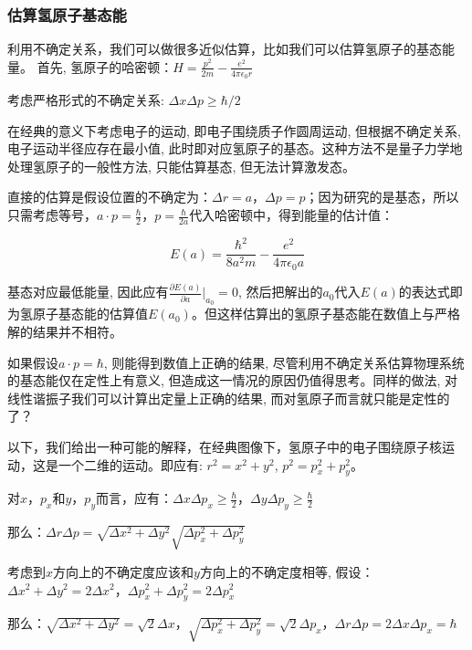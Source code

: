 \subsubsection{估算氢原子基态能}

利用不确定关系，我们可以做很多近似估算，比如我们可以估算氢原子的基态能量。
首先, 氢原子的哈密顿：$H = \frac{p^2}{2m} - \frac{e^2}{4 \pi
\epsilon_0 r}$



考虑严格形式的不确定关系: $\Delta x \Delta p \ge \hbar /2$

在经典的意义下考虑电子的运动, 即电子围绕质子作圆周运动,
但根据不确定关系, 电子运动半径应存在最小值,
此时即对应氢原子的基态。这种方法不是量子力学地处理氢原子的一般性方法,
只能估算基态, 但无法计算激发态。

直接的估算是假设位置的不确定为：$\Delta r = a$，$\Delta p =
p$；因为研究的是基态，所以只需考虑等号，$a \cdot p =
\frac{\hbar}{2}$，$p=\frac{\hbar}{2a}$代入哈密顿中，得到能量的估计值：

\begin{equation*}
  E(a)=\frac{\hbar^2}{8 a^2 m} - \frac{e^2}{4 \pi \epsilon_0 a}
\end{equation*}

基态对应最低能量, 因此应有$\frac{\partial E(a)}{\partial a} |_{a_0}
= 0$,
然后把解出的$a_0$代入$E(a)$的表达式即为氢原子基态能的估算值$E(a_0)$。但这样估算出的氢原子基态能在数值上与严格解的结果并不相符。


如果假设$a \cdot p = \hbar$, 则能得到数值上正确的结果,
尽管利用不确定关系估算物理系统的基态能仅在定性上有意义,
但造成这一情况的原因仍值得思考。同样的做法,
对线性谐振子我们可以计算出定量上正确的结果,
而对氢原子而言就只能是定性的了？

以下，我们给出一种可能的解释，在经典图像下，氢原子中的电子围绕原子核运动，这是一个二维的运动。即应有:
$r^2 =x^2 + y^2$, $p^2 = p_x^2 + p_y^2$。

对$x$，$p_x$和$y$，$p_y$而言，应有：$\Delta x \Delta p_x \ge
\frac{\hbar}{2}$，$\Delta y \Delta p_y \ge \frac{\hbar}{2}$

那么：$\Delta r \Delta p = \sqrt {\Delta x^2 + \Delta y^2}
\sqrt{\Delta p_x^2 + \Delta p_y^2}$


考虑到$x$方向上的不确定度应该和$y$方向上的不确定度相等,
假设：$\Delta x^2 + \Delta y^2 = 2 \Delta x^2$，$\Delta p_x^2 +
\Delta p_y^2 =2 \Delta p_x^2$

那么：$\sqrt {\Delta x^2 + \Delta y^2} = \sqrt{2} \Delta
x$，$\sqrt{\Delta p_x^2 + \Delta p_y^2} = \sqrt{2} \Delta
p_x$，$\Delta r \Delta p = 2 \Delta x \Delta p_x = \hbar$

